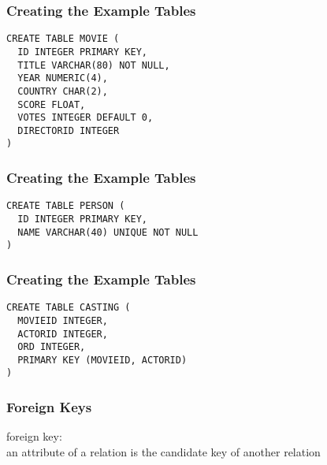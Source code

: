 \documentclass[dvipsnames]{beamer}
\theoremstyle{plain}
\begin{document}
\begin{frame}[fragile]
  \frametitle{Creating the Example Tables}

  \begin{example}
    \begin{lstlisting}
CREATE TABLE MOVIE (
  ID INTEGER PRIMARY KEY,
  TITLE VARCHAR(80) NOT NULL,
  YEAR NUMERIC(4),
  COUNTRY CHAR(2),
  SCORE FLOAT,
  VOTES INTEGER DEFAULT 0,
  DIRECTORID INTEGER
)
    \end{lstlisting}
  \end{example}
\end{frame}

\begin{frame}[fragile]
  \frametitle{Creating the Example Tables}

  \begin{example}
    \begin{lstlisting}
CREATE TABLE PERSON (
  ID INTEGER PRIMARY KEY,
  NAME VARCHAR(40) UNIQUE NOT NULL
)
    \end{lstlisting}
  \end{example}
\end{frame}

\begin{frame}[fragile]
  \frametitle{Creating the Example Tables}

  \begin{example}
    \begin{lstlisting}
CREATE TABLE CASTING (
  MOVIEID INTEGER,
  ACTORID INTEGER,
  ORD INTEGER,
  PRIMARY KEY (MOVIEID, ACTORID)
)
    \end{lstlisting}
  \end{example}
\end{frame}

\begin{frame}
  \frametitle{Foreign Keys}

  \begin{definition}
    \alert{foreign key}:\\
      an attribute of a relation is the candidate key of another relation
  \end{definition}
\end{frame}
\end{document}
